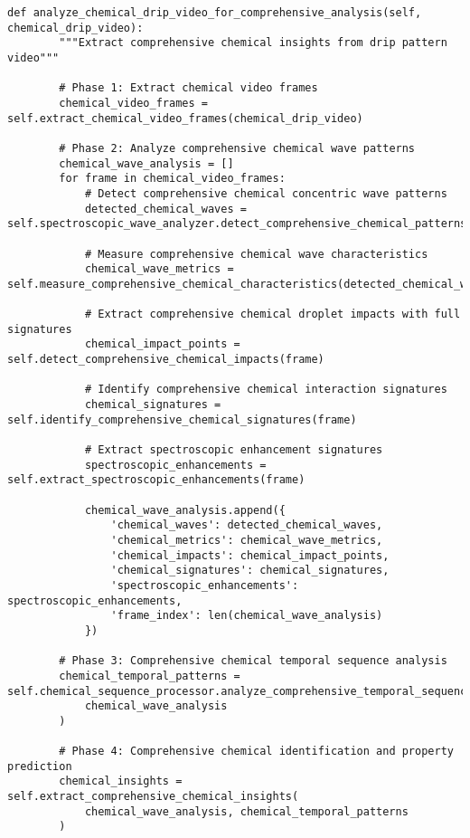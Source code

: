 \documentclass[12pt,a4paper]{article}
\begin{document}
\begin{algorithm}
\begin{algorithmic}[1]
\begin{table}[H]
\begin{lstlisting}[style=pythonstyle, caption=Computer Vision Comprehensive Chemical Pattern Analysis]
    def analyze_chemical_drip_video_for_comprehensive_analysis(self, chemical_drip_video):
        """Extract comprehensive chemical insights from drip pattern video"""
        
        # Phase 1: Extract chemical video frames
        chemical_video_frames = self.extract_chemical_video_frames(chemical_drip_video)
        
        # Phase 2: Analyze comprehensive chemical wave patterns
        chemical_wave_analysis = []
        for frame in chemical_video_frames:
            # Detect comprehensive chemical concentric wave patterns
            detected_chemical_waves = self.spectroscopic_wave_analyzer.detect_comprehensive_chemical_patterns(frame)
            
            # Measure comprehensive chemical wave characteristics
            chemical_wave_metrics = self.measure_comprehensive_chemical_characteristics(detected_chemical_waves)
            
            # Extract comprehensive chemical droplet impacts with full signatures
            chemical_impact_points = self.detect_comprehensive_chemical_impacts(frame)
            
            # Identify comprehensive chemical interaction signatures
            chemical_signatures = self.identify_comprehensive_chemical_signatures(frame)
            
            # Extract spectroscopic enhancement signatures
            spectroscopic_enhancements = self.extract_spectroscopic_enhancements(frame)
            
            chemical_wave_analysis.append({
                'chemical_waves': detected_chemical_waves,
                'chemical_metrics': chemical_wave_metrics,
                'chemical_impacts': chemical_impact_points,
                'chemical_signatures': chemical_signatures,
                'spectroscopic_enhancements': spectroscopic_enhancements,
                'frame_index': len(chemical_wave_analysis)
            })
        
        # Phase 3: Comprehensive chemical temporal sequence analysis
        chemical_temporal_patterns = self.chemical_sequence_processor.analyze_comprehensive_temporal_sequence(
            chemical_wave_analysis
        )
        
        # Phase 4: Comprehensive chemical identification and property prediction
        chemical_insights = self.extract_comprehensive_chemical_insights(
            chemical_wave_analysis, chemical_temporal_patterns
        )
        

\end{lstlisting}
\end{table}
\end{algorithmic}
\end{algorithm}
\end{document}
